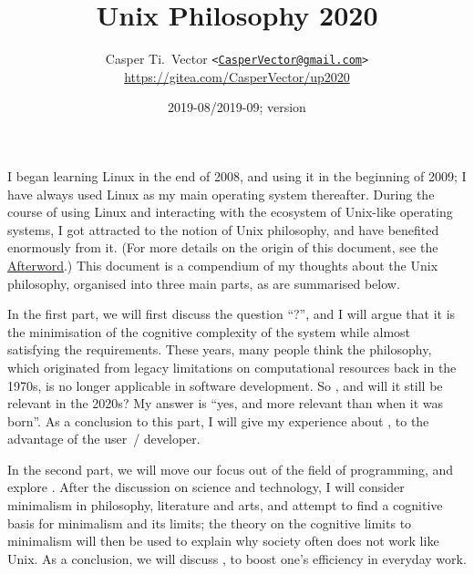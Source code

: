 \documentclass{article}
\begin{document}
\title{\textbf{Unix Philosophy 2020}}
\author{%
	Casper Ti.\ Vector
	\texttt{<\url{CasperVector@gmail.com}>}\\
	\url{https://gitea.com/CasperVector/up2020}%
}
\date{2019-08/2019-09; version \docversion}
\maketitle
\vspace{\baselineskip}
\tableofcontents


I began learning Linux in the end of 2008, and using it in the beginning
of 2009; I have always used Linux as my main operating system thereafter.
During the course of using Linux and interacting with the ecosystem of
Unix-like operating systems, I got attracted to the notion of Unix
philosophy, and have benefited enormously from it.  (For more details on
the origin of this document, see the \hyperref[sec:afterword]{Afterword}.)
This document is a compendium of my thoughts about the Unix philosophy,
organised into three main parts, as are summarised below.

In the first part, we will first discuss the question ``?'', and I will argue that it is the minimisation
of the cognitive complexity of the system while almost satisfying the
requirements.  These years, many people think the philosophy, which originated
from legacy limitations on computational resources back in the 1970s, is no
longer applicable in software development.  So , and will it still be relevant in the 2020s?  My answer is
``yes, and more relevant than when it was born''.  As a conclusion to this part,
I will give my experience about , to the advantage of the user~/ developer.

In the second part, we will move our focus out of the field of programming, and
explore .  After the discussion on
science and technology, I will consider minimalism in philosophy, literature
and arts, and attempt to find a cognitive basis for minimalism and its limits;
the theory on the cognitive limits to minimalism will then be used to explain
why society often does not work like Unix.  As a conclusion, we will discuss
,
to boost one's efficiency in everyday work.
\end{document}
